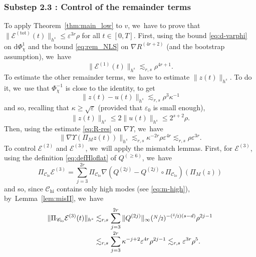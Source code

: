 \documentclass[JEP,XML,SOM,Unicode,published]{cedram}
\newcommand{\Psfrac}[2]{(\sfrac{#1}{#2})}
\theoremstyle{plain}
\theoremstyle{definition}
\DeclareMathOperator{\hi}{hi}
\DeclareMathOperator{\lo}{lo}
\newcommand{\1}{\mathbf{1}}
\newcommand{\Clo}{\mathscr{C}_{\lo}}
\newcommand{\Chigh}{\mathscr{C}_{\hi}}
\begin{document}
\subsubsection*{Substep 2.3 : Control of the remainder terms}
To apply Theorem~\ref{thm:main_low} to $v$, we~have to prove that $\| \mathcal{E}^{\mathrm{(tot)}}(t) \|_{h^s} \leq \varepsilon^{3r} \rho $ for all $t\in [0,T]$.
First, using the bound \eqref{eq:d-varphi} on $\mathrm{d}\Phi_\chi^1$ and the bound \eqref{eq:rem_NLS} on $\nabla R^{(4r+2)}$ (and the bootstrap assumption), we~have\vspace*{-3pt}
\begin{equation}
\label{eq:estE1}
\| \mathcal{E}^{(1)}(t) \|_{h^s} \lesssim_{r,s} \rho^{4r+1}.
\end{equation}
To estimate the other remainder terms, we~have to estimate $\| z(t) \|_{h^s}$. To do it, we~use that $\Phi_\chi^{-1}$ is close to the identity, to get\vspace*{-3pt}
\begin{equation}
\label{eq:z_close_to_u}
\| z(t) - u(t) \|_{h^s} \lesssim_{r,s} \rho^3 \kappa^{-1}
\end{equation}
and so, recalling that $\kappa \geq \sqrt{\varepsilon}$ (provided that $\varepsilon_0$ is small enough),\vspace*{-3pt}
\[
\| z(t) \|_{h^s} \leq 2 \| u(t) \|_{h^s} \leq 2^{s+2} \rho.
\]
Then, using the estimate
\eqref{eq:R-res}
on $\nabla \Upsilon$, we~have\vspace*{-3pt}
\begin{equation}
\label{eq:estups}
\| \nabla \Upsilon(\Pi_M z(t))\|_{h^s} \lesssim_{r,s} \kappa^{-2r} \rho \varepsilon^{4r} \lesssim_{r,s} \rho \varepsilon^{3r}.
\end{equation}
To control $\mathcal{E}^{(2)}$ and $\mathcal{E}^{(3)}$, we~will apply the mismatch lemmas. First, for $\mathcal{E}^{(3)}$, using the definition \eqref{eq:defHloflat} of $Q^{(\geq 6)}$, we~have\vspace*{-3pt}
\[
\Pi_{\Clo} \mathcal{E}^{(3)} = \sum_{j = 3}^{2r} \Pi_{\Clo} \nabla (Q^{(2j)} - Q^{(2j)} \circ \Pi_{\Clo})(\Pi_M(z))
\]
and so, since $\Chigh$ contains only high modes (see \eqref{eq:m-high}), by~Lemma~\ref{lem:misII}, we~have\vspace*{-3pt}
\begin{equation}
\label{eq:estE3}
\begin{split}
\|\Pi_{\Clo} \mathcal{E}^{(3)} (t)\|_{h^{s}} &\lesssim_{r,s} \sum_{j = 3}^{2r} \| Q^{(2j)}\|_{\infty}(\sfrac{N}2)^{-\Psfrac{\delta}{2}(s-d)} \rho^{2j-1}\\[
-3pt]
&\lesssim_{r,s} \sum_{j = 3}^{2r} \kappa^{-j+2} \varepsilon^{4r} \rho^{2j-1} \lesssim_{r,s} \varepsilon^{3r} \rho^{5}.
\end{split}
\end{equation}
\end{document}
